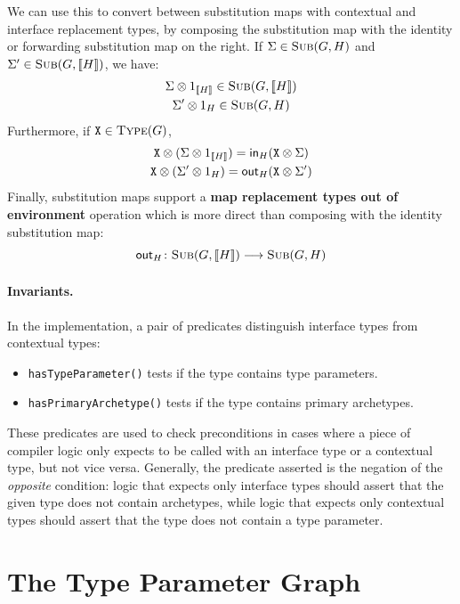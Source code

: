 \documentclass[../generics]{subfiles}
\begin{document}
We can use this to convert between substitution maps with contextual and interface replacement types, by composing the substitution map with the identity or forwarding substitution map on the right. If $\Sigma\in\textsc{Sub}({G, H})$ and $\Sigma' \in \textsc{Sub}({G, [\![H]\!]})$, we have:
\begin{gather*}
\Sigma \otimes 1_{[\![H]\!]}\in\textsc{Sub}({G, [\![H]\!]})\\
\Sigma' \otimes 1_H\in\textsc{Sub}({G, H})
\end{gather*}
Furthermore, if $\texttt{X}\in\textsc{Type}({G})$,
\begin{gather*}
\texttt{X}\otimes (\Sigma\otimes 1_{[\![H]\!]}) = \mathsf{in}_{H}(\texttt{X} \otimes \Sigma)\\
\texttt{X}\otimes (\Sigma' \otimes 1_H) = \mathsf{out}_{H}(\texttt{X} \otimes \Sigma')
\end{gather*}
Finally, substitution maps support a \textbf{map replacement types out of environment} operation which is more direct than composing with the identity substitution map:
\[\mathsf{out}_H\colon\textsc{Sub}({G, [\![H]\!]})\longrightarrow\textsc{Sub}({G, H})\]

\paragraph{Invariants.} In the implementation, a pair of predicates distinguish interface types from contextual types:
\begin{itemize}
\item \texttt{hasTypeParameter()} tests if the type contains type parameters.
\item \texttt{hasPrimaryArchetype()} tests if the type contains primary archetypes.
\end{itemize}
These predicates are used to check preconditions in cases where a piece of compiler logic only expects to be called with an interface type or a contextual type, but not vice versa. Generally, the predicate asserted is the negation of the \emph{opposite} condition: logic that expects only interface types should assert that the given type does not contain archetypes, while logic that expects only contextual types should assert that the type does not contain a type parameter.

\section{The Type Parameter Graph}\label{type parameter graph}
\end{document}
